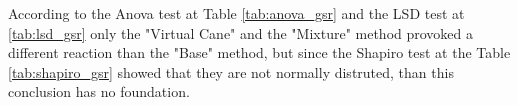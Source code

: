 %
%
%
%
%
%
%
%
%
%
%    
%
%

According to the Anova test at Table \ref{tab:anova_gsr} and the LSD test at \ref{tab:lsd_gsr} only the "Virtual Cane" and the "Mixture" method provoked a different reaction than the "Base" method, but since the Shapiro test at the Table \ref{tab:shapiro_gsr} showed that they are not normally distruted, than this conclusion has no foundation.

\FloatBarrier

